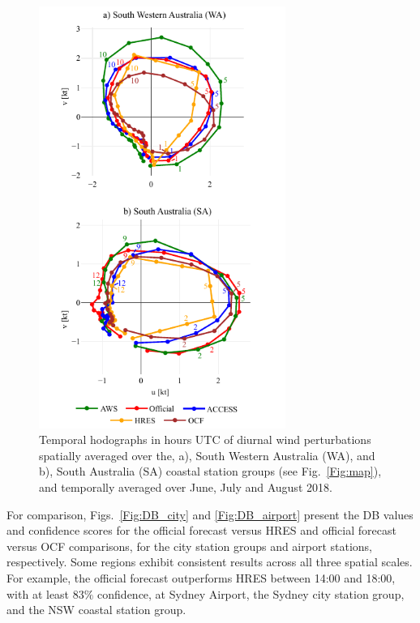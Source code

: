 \documentclass{ametsoc}
\begin{document}
\begin{figure}
\centering
\includegraphics[width=19pc]{clim_hodo.pdf}
\caption{Temporal hodographs in hours UTC of diurnal wind perturbations spatially averaged over the, a), South Western Australia (WA), and b), South Australia (SA) coastal station groups (see Fig.~\ref{Fig:map}), and temporally averaged over June, July and August 2018.}
\label{Fig:clim_hodo}
\end{figure}

For comparison, Figs.~\ref{Fig:DB_city} and \ref{Fig:DB_airport} present the DB values and confidence scores for the official forecast versus HRES and official forecast versus OCF comparisons, for the city station groups and airport stations, respectively. Some regions exhibit consistent results across all three spatial scales. For example, the official forecast outperforms HRES between 14:00 and 18:00, with at least $83\%$ confidence, at Sydney Airport, the Sydney city station group, and the NSW coastal station group. 
\end{document}
